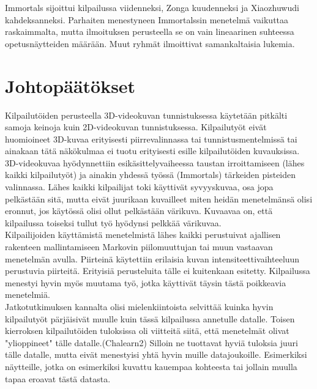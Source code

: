Immortals sijoittui kilpailussa viidenneksi, Zonga kuudenneksi ja Xiaozhuwudi kahdeksanneksi. Parhaiten menestyneen Immortalssin
menetelmä vaikuttaa raskaimmalta, mutta ilmoituksen perusteella se on vain lineaarinen suhteessa opetusnäytteiden määrään.
Muut ryhmät ilmoittivat samankaltaisia lukemia.


\section {Johtopäätökset}

Kilpailutöiden perusteella 3D-videokuvan tunnistuksessa käytetään pitkälti samoja keinoja kuin 2D-videokuvan tunnistuksessa. Kilpailutyöt eivät huomioineet
3D-kuvaa erityisesti piirrevalinnassa tai tunnistusmentelmissä tai ainakaan tätä näkökulmaa ei tuotu erityisesti
esille kilpailutöiden kuvauksissa. 3D-videokuvaa hyödynnettiin esikäsittelyvaiheessa taustan irroittamiseen 
(lähes kaikki kilpailutyöt) ja ainakin yhdessä työssä (Immortals) tärkeiden pisteiden valinnassa. 
Lähes kaikki kilpailijat toki käyttivät syvyyskuvaa, osa jopa pelkästään sitä, mutta eivät juurikaan
kuvailleet miten heidän menetelmänsä olisi eronnut, jos käytössä olisi ollut pelkästään värikuva.
Kuvaavaa on, että kilpailussa toiseksi tullut työ hyödynsi pelkkää värikuvaa.\\

Kilpailijoiden käyttämistä menetelmistä lähes kaikki perustuivat ajallisen rakenteen mallintamiseen 
Markovin piilomuuttujan tai muun vastaavan menetelmän avulla. Piirteinä käytettiin erilaisia kuvan intensiteettivaihteeluun perustuvia piirteitä. Erityisiä perusteluita tälle ei kuitenkaan esitetty.
Kilpailussa menestyi hyvin myös muutama työ, jotka käyttivät täysin tästä poikkeavia menetelmiä.\\

Jatkotutkimuksen kannalta olisi mielenkiintoista selvittää kuinka hyvin kilpailutyöt pärjäisivät
muulle kuin tässä kilpailussa annetulle datalle. Toisen kierroksen kilpailutöiden tuloksissa oli viitteitä
siitä, että menetelmät olivat "ylioppineet" tälle datalle.(Chalearn2) Silloin ne tuottavat hyviä tuloksia juuri
tälle datalle, mutta eivät menestyisi yhtä hyvin muille datajoukoille. Esimerkiksi näytteille, jotka on esimerkiksi kuvattu kauempaa 
kohteesta tai jollain muulla tapaa eroavat tästä datasta. \\

